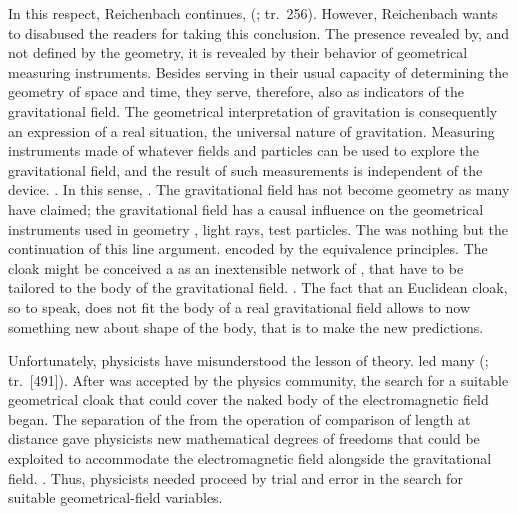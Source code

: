 \documentclass[draft]{article}
\renewcommand{\oe}{;~o.e.{}}
\newcommand{\oemph}[1]{\emph{#1}}
\renewcommand{\rzlp}[2]{(\cite[#1]{Reichenbach1928}; tr.\ #2)\xspace}
\renewcommand{\rzlap}[2]{(\cite[#1]{Reichenbach1928}; tr.\ [#2])\xspace}
\begin{document}
In this respect, Reichenbach continues, \q{we may say that gravitation is \oemph{geometrized}} \rzlp{294\oe}{256}. However, Reichenbach wants to disabused the readers for taking this conclusion. The presence revealed by, and not defined by the geometry, it is revealed by their behavior of geometrical measuring instruments. Besides serving in their usual capacity of determining the geometry of space and time, they serve, therefore, also as indicators of the gravitational field. The geometrical interpretation of gravitation is consequently an expression of a real situation, the universal nature of gravitation. Measuring instruments made of whatever fields and particles can be used to explore the gravitational field, and the result of such measurements is independent of the device. . In this sense, . The gravitational field has not become geometry as many have claimed; the gravitational field has a causal influence on the geometrical instruments used in geometry \rac, light rays, test particles\etc. The \Ap was nothing but the continuation of this line argument.  encoded by the equivalence principles. The cloak might be conceived a as an inextensible network of \rac, that have to be tailored to the body of the gravitational field. . The fact that an Euclidean cloak, so to speak, does not fit the body of a real gravitational field allows to now something new about shape of the body, that is to make the new predictions.

Unfortunately, physicists have misunderstood the lesson of theory.   led many  \rzlap{352}{491}. After \gr was accepted by the physics community, the search for a suitable geometrical cloak that could cover the naked body of the electromagnetic field began. The separation of the  \Gtmn from the operation of comparison of length at distance \gmn gave physicists new mathematical degrees of freedoms that could be exploited to accommodate the electromagnetic field alongside the gravitational field. . Thus, physicists needed proceed by trial and error in the search for suitable geometrical-field variables.
\end{document}
